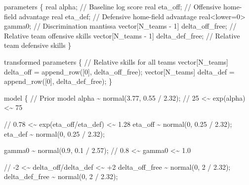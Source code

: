 \documentclass[
  letterpaper,
  DIV=11,
  numbers=noendperiod]{scrartcl}
\newenvironment{Shaded}{\begin{snugshade}}{\end{snugshade}}
\newcommand{\CommentTok}[1]{\textcolor[rgb]{0.37,0.37,0.37}{#1}}
\newcommand{\DataTypeTok}[1]{\textcolor[rgb]{0.68,0.00,0.00}{#1}}
\newcommand{\DecValTok}[1]{\textcolor[rgb]{0.68,0.00,0.00}{#1}}
\newcommand{\FloatTok}[1]{\textcolor[rgb]{0.68,0.00,0.00}{#1}}
\newcommand{\KeywordTok}[1]{\textcolor[rgb]{0.00,0.23,0.31}{#1}}
\newcommand{\NormalTok}[1]{\textcolor[rgb]{0.00,0.23,0.31}{#1}}
\begin{document}
\begin{codelisting}
\begin{Shaded}
\begin{Highlighting}[]
\KeywordTok{parameters}\NormalTok{ \{}
  \DataTypeTok{real}\NormalTok{ alpha;                         }\CommentTok{// Baseline log score}
  \DataTypeTok{real}\NormalTok{ eta\_off;                       }\CommentTok{// Offensive home{-}field advantage}
  \DataTypeTok{real}\NormalTok{ eta\_def;                       }\CommentTok{// Defensive home{-}field advantage}
  \DataTypeTok{real}\NormalTok{\textless{}}\KeywordTok{lower}\NormalTok{=}\DecValTok{0}\NormalTok{\textgreater{} gamma0;               }\CommentTok{// Discrimination mantissa}
  \DataTypeTok{vector}\NormalTok{[N\_teams {-} }\DecValTok{1}\NormalTok{] delta\_off\_free; }\CommentTok{// Relative team offensive skills}
  \DataTypeTok{vector}\NormalTok{[N\_teams {-} }\DecValTok{1}\NormalTok{] delta\_def\_free; }\CommentTok{// Relative team defensive skills}
\NormalTok{\}}

\KeywordTok{transformed parameters}\NormalTok{ \{}
  \CommentTok{// Relative skills for all teams}
  \DataTypeTok{vector}\NormalTok{[N\_teams] delta\_off = append\_row([}\DecValTok{0}\NormalTok{]\textquotesingle{}, delta\_off\_free);}
  \DataTypeTok{vector}\NormalTok{[N\_teams] delta\_def = append\_row([}\DecValTok{0}\NormalTok{]\textquotesingle{}, delta\_def\_free);}
\NormalTok{\}}

\KeywordTok{model}\NormalTok{ \{}
  \CommentTok{// Prior model}
\NormalTok{  alpha \textasciitilde{} normal(}\FloatTok{3.77}\NormalTok{, }\FloatTok{0.55}\NormalTok{ / }\FloatTok{2.32}\NormalTok{); }\CommentTok{// 25 \textless{}\textasciitilde{}  exp(alpha) \textless{}\textasciitilde{} 75}

  \CommentTok{// 0.78 \textless{}\textasciitilde{} exp(eta\_off/eta\_def) \textless{}\textasciitilde{} 1.28}
\NormalTok{  eta\_off \textasciitilde{} normal(}\DecValTok{0}\NormalTok{, }\FloatTok{0.25}\NormalTok{ / }\FloatTok{2.32}\NormalTok{);}
\NormalTok{  eta\_def \textasciitilde{} normal(}\DecValTok{0}\NormalTok{, }\FloatTok{0.25}\NormalTok{ / }\FloatTok{2.32}\NormalTok{);}

\NormalTok{  gamma0 \textasciitilde{} normal(}\FloatTok{0.9}\NormalTok{, }\FloatTok{0.1}\NormalTok{ / }\FloatTok{2.57}\NormalTok{); }\CommentTok{// 0.8  \textless{}\textasciitilde{} gamma0 \textless{}\textasciitilde{} 1.0}

  \CommentTok{// {-}2 \textless{}\textasciitilde{} delta\_off/delta\_def \textless{}\textasciitilde{} +2}
\NormalTok{  delta\_off\_free \textasciitilde{} normal(}\DecValTok{0}\NormalTok{, }\DecValTok{2}\NormalTok{ / }\FloatTok{2.32}\NormalTok{);}
\NormalTok{  delta\_def\_free \textasciitilde{} normal(}\DecValTok{0}\NormalTok{, }\DecValTok{2}\NormalTok{ / }\FloatTok{2.32}\NormalTok{);}


\end{Highlighting}
\end{Shaded}
\end{codelisting}
\end{document}
